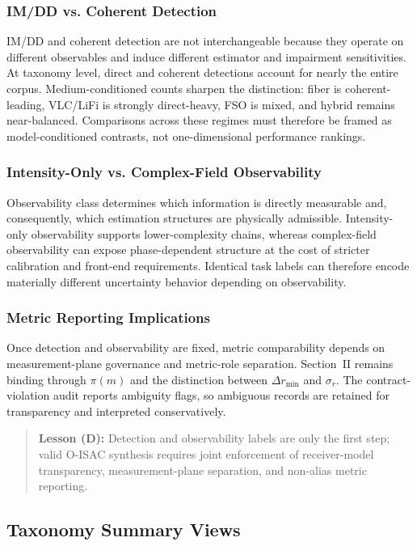 \subsubsection{IM/DD vs. Coherent Detection}
IM/DD and coherent detection are not interchangeable because they operate on different observables and induce different estimator and impairment sensitivities. At taxonomy level, direct and coherent detections account for nearly the entire corpus. Medium-conditioned counts sharpen the distinction: fiber is coherent-leading, VLC/LiFi is strongly direct-heavy, FSO is mixed, and hybrid remains near-balanced. Comparisons across these regimes must therefore be framed as model-conditioned contrasts, not one-dimensional performance rankings.

\subsubsection{Intensity-Only vs. Complex-Field Observability}
Observability class determines which information is directly measurable and, consequently, which estimation structures are physically admissible. Intensity-only observability supports lower-complexity chains, whereas complex-field observability can expose phase-dependent structure at the cost of stricter calibration and front-end requirements. Identical task labels can therefore encode materially different uncertainty behavior depending on observability.

\subsubsection{Metric Reporting Implications}
Once detection and observability are fixed, metric comparability depends on measurement-plane governance and metric-role separation. Section~II remains binding through $\pi(m)$ and the distinction between $\Delta r_{\min}$ and $\sigma_r$. The contract-violation audit reports ambiguity flags, so ambiguous records are retained for transparency and interpreted conservatively.

\begin{quote}
\textbf{Lesson (D):} Detection and observability labels are only the first step; valid O-ISAC synthesis requires joint enforcement of receiver-model transparency, measurement-plane separation, and non-alias metric reporting.
\end{quote}

\subsection{Taxonomy Summary Views}
